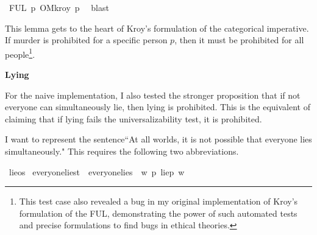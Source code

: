 \begin{isabellebody}
\ FUL\ {\isacartoucheopen}{\isasymexists}p{\isachardot}\ {\isasymTurnstile}\isactrlemph O{\isacharbraceleft}\isactrlemph {\isasymnot}M{\isacharunderscore}kroy{\isacharbraceright}\ p{\isacartoucheclose}\ \isamarkupfalse%
\ blast\isanewline
\ \ \isamarkupfalse%
%
\endisatagproof
{\isafoldproof}%
%
\isadelimproof
%
\endisadelimproof
%
\begin{isamarkuptext}%
This lemma gets to the heart of Kroy's formulation of the categorical imperative. If murder is prohibited
for a specific person $p$, then it must be prohibited for all people\footnote{This test case also revealed a 
bug in my original implementation of Kroy's formulation of the FUL, demonstrating the power of such 
automated tests and precise formulations to find bugs in ethical theories.}.%
\end{isamarkuptext}\isamarkuptrue%
%
\begin{isamarkuptext}%
\textbf{Lying}%
\end{isamarkuptext}\isamarkuptrue%
%
\begin{isamarkuptext}%
For the naive implementation, I also tested the stronger proposition that if not 
everyone can simultaneously lie, then lying is prohibited. This is the equivalent of claiming that 
if lying fails the universalizability test, it is prohibited.%
\end{isamarkuptext}\isamarkuptrue%
%
\begin{isamarkuptext}%
I want to represent the sentence``At all worlds, it is 
      not possible that everyone lies simultaneously." This requires the following two abbreviations.%
\end{isamarkuptext}\isamarkuptrue%
\isamarkupfalse%
\ lie{\isacharcolon}{\isacharcolon}os%
\isadelimproof
%
\endisadelimproof
%
\isatagproof
%
\endisatagproof
{\isafoldproof}%
%
\isadelimproof
%
\endisadelimproof
\isanewline
{}\isamarkupfalse%
\ everyone{\isacharunderscore}lies{\isacharcolon}{\isacharcolon}t\ \ {\isachardoublequoteopen}everyone{\isacharunderscore}lies\ {\isasymequiv}\ {\isasymlambda}w{\isachardot}\ {\isacharparenleft}{\isasymforall}p{\isachardot}\ {\isacharparenleft}lie{\isacharparenleft}p{\isacharparenright}\ w{\isacharparenright}{\isacharparenright}{\isachardoublequoteclose}\isanewline
%
\end{isabellebody}
